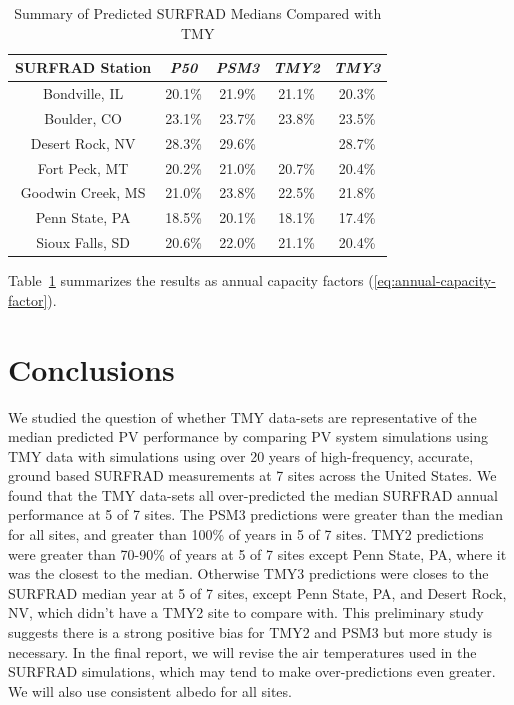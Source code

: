 \documentclass[conference]{IEEEtran}
\begin{document}
\begin{table}[htbp]
\caption{Summary of Predicted SURFRAD Medians Compared with TMY}
\begin{center}
\begin{tabular}{|c|c|c|c|c|}
\hline
\textbf{SURFRAD Station} & \textbf{\textit{P50}}& \textbf{\textit{PSM3}}& \textbf{\textit{TMY2}}& \textbf{\textit{TMY3}} \\
\hline
Bondville, IL    & 20.1\%& 21.9\%& 21.1\%& 20.3\% \\
Boulder, CO      & 23.1\%& 23.7\%& 23.8\%& 23.5\% \\
Desert Rock, NV  & 28.3\%& 29.6\%&       & 28.7\% \\
Fort Peck, MT    & 20.2\%& 21.0\%& 20.7\%& 20.4\% \\
Goodwin Creek, MS& 21.0\%& 23.8\%& 22.5\%& 21.8\% \\
Penn State, PA   & 18.5\%& 20.1\%& 18.1\%& 17.4\% \\
Sioux Falls, SD  & 20.6\%& 22.0\%& 21.1\%& 20.4\% \\
\hline
\end{tabular}
\label{table:surfrad-tmy-summary}
\end{center}
\end{table}

Table~\ref{table:surfrad-tmy-summary} summarizes the results as annual capacity factors (\ref{eq:annual-capacity-factor}).

\section{Conclusions}
We studied the question of whether TMY data-sets are representative of the median predicted PV performance by comparing PV system simulations using TMY data with simulations using over 20 years of high-frequency, accurate, ground based SURFRAD measurements at 7 sites across the United States. We found that the TMY data-sets all over-predicted the median SURFRAD annual performance at 5 of 7 sites. The PSM3 predictions were greater than the median for all sites, and greater than 100\% of years in 5 of 7 sites. TMY2 predictions were greater than 70-90\% of years at 5 of 7 sites except Penn State, PA, where it was the closest to the median. Otherwise TMY3 predictions were closes to the SURFRAD median year at 5 of 7 sites, except Penn State, PA, and Desert Rock, NV, which didn't have a TMY2 site to compare with. This preliminary study suggests there is a strong positive bias for TMY2 and PSM3 but more study is necessary. In the final report, we will revise the air temperatures used in the SURFRAD simulations, which may tend to make over-predictions even greater. We will also use consistent albedo for all sites.



\end{document}
